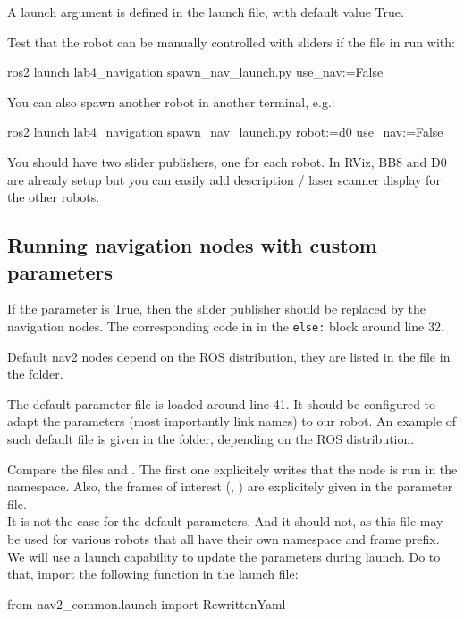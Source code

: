 \documentclass{ecnreport}
\begin{document}
A launch argument  is defined in the launch file, with default value True.

Test that the robot can be manually controlled with sliders if the file in run with:
\begin{bashcodelarge}
 ros2 launch lab4_navigation spawn_nav_launch.py use_nav:=False
\end{bashcodelarge}

You can also spawn another robot in another terminal, e.g.:
\begin{bashcodelarge}
 ros2 launch lab4_navigation spawn_nav_launch.py robot:=d0 use_nav:=False
\end{bashcodelarge}
You should have two slider publishers, one for each robot. In RViz, BB8 and D0 are already setup but you can easily add description / laser scanner display for the other robots.

\subsection{Running navigation nodes with custom parameters}

If the parameter  is True, then the slider publisher should be replaced by the navigation nodes. The corresponding code in in the \texttt{else:} block around line 32.

Default nav2 nodes depend on the ROS distribution, they are listed in the file  in the  folder.

The default parameter file is loaded around line 41. It should be configured to adapt the parameters (most importantly link names) to our robot. An example of such default file is given in the  folder, depending on the ROS distribution.

Compare the files  and . The first one explicitely writes that the node is run in the  namespace. Also, the frames of interest (, ) are explicitely given in the parameter file.\\

It is not the case for the default parameters. And it should not, as this file may be used for various robots that all have their own namespace and frame prefix.\\
We will use a launch capability to update the parameters during launch. Do to that, import the following function in the launch file:
\begin{pythoncodelarge}
from nav2_common.launch import RewrittenYaml
\end{pythoncodelarge}
\end{document}
